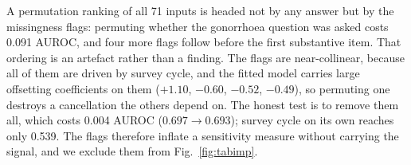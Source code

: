 \documentclass[lettersize,journal]{IEEEtran}
\begin{document}
\begin{table}[t]
\caption{Questionnaire Expert on NHANES ($n=12{,}634$, 24.6\% Positive)}
\label{tab:tabular}
\centering\footnotesize
\setlength{\tabcolsep}{4pt}
\end{table}

A permutation ranking of all 71 inputs is headed not by any answer but by the missingness flags: permuting whether the gonorrhoea question was asked costs 0.091 AUROC, and four more flags follow before the first substantive item. That ordering is an artefact rather than a finding. The flags are near-collinear, because all of them are driven by survey cycle, and the fitted model carries large offsetting coefficients on them ($+1.10$, $-0.60$, $-0.52$, $-0.49$), so permuting one destroys a cancellation the others depend on. The honest test is to remove them all, which costs 0.004 AUROC ($0.697\to0.693$); survey cycle on its own reaches only 0.539. The flags therefore inflate a sensitivity measure without carrying the signal, and we exclude them from Fig.~\ref{fig:tabimp}.
\end{document}
